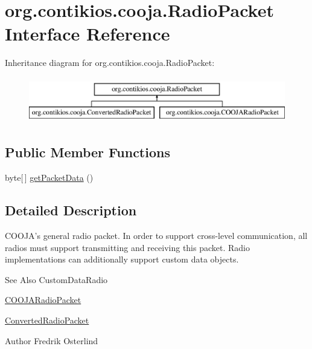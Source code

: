 \hypertarget{interfaceorg_1_1contikios_1_1cooja_1_1RadioPacket}{\section{org.\-contikios.\-cooja.\-Radio\-Packet Interface Reference}
\label{interfaceorg_1_1contikios_1_1cooja_1_1RadioPacket}
}
Inheritance diagram for org.\-contikios.\-cooja.\-Radio\-Packet\-:\begin{figure}[H]
\begin{center}
\leavevmode
\includegraphics[height=2.000000cm]{interfaceorg_1_1contikios_1_1cooja_1_1RadioPacket}
\end{center}
\end{figure}
\subsection*{Public Member Functions}
\begin{DoxyCompactItemize}
\item 
byte\mbox{[}$\,$\mbox{]} \hyperlink{interfaceorg_1_1contikios_1_1cooja_1_1RadioPacket_aaff36d4c272ded32671f47ff68253415}{get\-Packet\-Data} ()
\end{DoxyCompactItemize}


\subsection{Detailed Description}
C\-O\-O\-J\-A's general radio packet. In order to support cross-\/level communication, all radios must support transmitting and receiving this packet. Radio implementations can additionally support custom data objects.

\begin{DoxySeeAlso}{See Also}
Custom\-Data\-Radio 

\hyperlink{classorg_1_1contikios_1_1cooja_1_1COOJARadioPacket}{C\-O\-O\-J\-A\-Radio\-Packet} 

\hyperlink{classorg_1_1contikios_1_1cooja_1_1ConvertedRadioPacket}{Converted\-Radio\-Packet} 
\end{DoxySeeAlso}
\begin{DoxyAuthor}{Author}
Fredrik Osterlind 
\end{DoxyAuthor}


